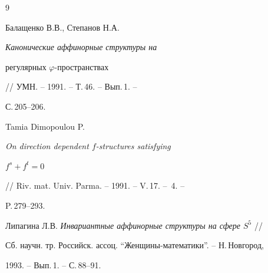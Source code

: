 \begin{thebibliography}{9} 


 




Балащенко В.В., Степанов Н.А. {\em Канонические аффинорные структуры на 


регулярных $\varphi$-пространствах} // УМН. -- 1991. -- Т.\,46. -- Вып.\,1. -- 


С.\,205--206. 




Tamia Dimopoulou P. {\em On direction dependent $f$-structures satisfying 


$f^s+f^t=0$} // Riv. mat. Univ. Parma. -- 1991. -- V.\,17. -- \No\,4. -- 


P.\,279--293. 




Липагина Л.В. {\em Инвариантные аффинорные структуры на сфере $S^5$} // 


Сб. научн. тр. Российск. ассоц. ``Женщины-математики''. -- Н.\,Новгород, 


1993. -- Вып.\,1. -- С.\,88--91. 


 


 


\end{thebibliography} 


 


\vskip 2cm 


 






 


 


